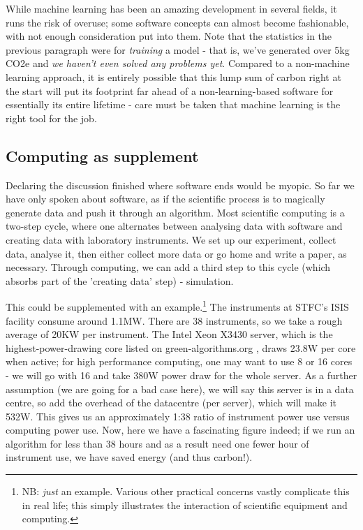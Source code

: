 \documentclass{article}
\begin{document}
While machine learning has been an amazing development in several fields, it runs the risk of overuse; some software concepts can almost become fashionable, with not enough consideration put into them. Note that the statistics in the previous paragraph were for \emph{training} a model - that is, we've generated over 5kg CO2e and \emph{we haven't even solved any problems yet}. Compared to a non-machine learning approach, it is entirely possible that this lump sum of carbon right at the start will put its footprint far ahead of a non-learning-based software for essentially its entire lifetime - care must be taken that machine learning is the right tool for the job.


\subsection{Computing as supplement}
Declaring the discussion finished where software ends would be myopic. So far we have only spoken about software, as if the scientific process is to magically generate data and push it through an algorithm. Most scientific computing is a two-step cycle, where one alternates between analysing data with software and creating data with laboratory instruments. We set up our experiment, collect data, analyse it, then either collect more data or go home and write a paper, as necessary. Through computing, we can add a third step to this cycle (which absorbs part of the 'creating data' step) - simulation. \newline

This could be supplemented with an example.\footnote{NB: \emph{just} an example. Various other practical concerns vastly complicate this in real life; this simply illustrates the interaction of scientific equipment and computing.} The instruments at STFC's ISIS facility consume around 1.1MW.\citep{findlay2021practical} There are 38 instruments, so we take a rough average of 20KW per instrument. The Intel Xeon X3430 server, which is the highest-power-drawing core listed on green-algorithms.org \citep{lannelongue2021green}, draws 23.8W per core when active; for high performance computing, one may want to use 8 or 16 cores - we will go with 16 and take 380W power draw for the whole server. As a further assumption (we are going for a bad case here), we will say this server is in a data centre, so add the overhead of the datacentre (per server), which will make it 532W. This gives us an approximately 1:38 ratio of instrument power use versus computing power use. Now, here we have a fascinating figure indeed; if we run an algorithm for less than 38 hours and as a result need one fewer hour of instrument use, we have saved energy (and thus carbon!). \newline
\end{document}
